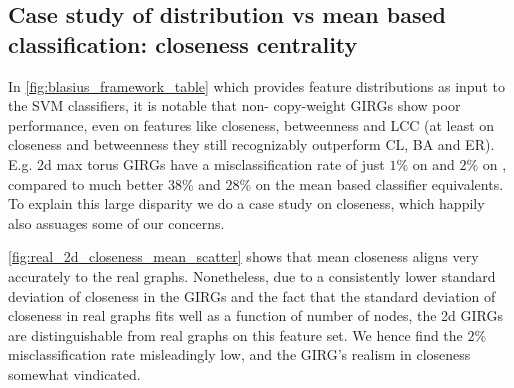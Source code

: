 \subsection{Case study of distribution vs mean based classification: closeness centrality}
In \cref{fig:blasius_framework_table} which provides feature distributions as input to the SVM classifiers, it is notable that non- copy-weight GIRGs show poor performance, even on  features like closeness, betweenness and LCC (at least on closeness and betweenness they still recognizably outperform CL, BA and ER). E.g. 2d max torus GIRGs have a misclassification rate of just $1\%$ on  and $2\%$ on , compared to much better $38\%$ and $28\%$ on the mean based classifier equivalents. To explain this large disparity we do a case study on closeness, which happily also assuages some of our concerns.

\cref{fig:real_2d_closeness_mean_scatter} shows that mean closeness aligns very accurately to the real graphs. Nonetheless, due to a consistently lower standard deviation of closeness in the GIRGs and the fact that the standard deviation of closeness in real graphs fits well as a function of number of nodes, the 2d GIRGs are distinguishable from real graphs on this feature set. We hence find the $2\%$ misclassification rate misleadingly low, and the GIRG's realism in closeness somewhat vindicated.


